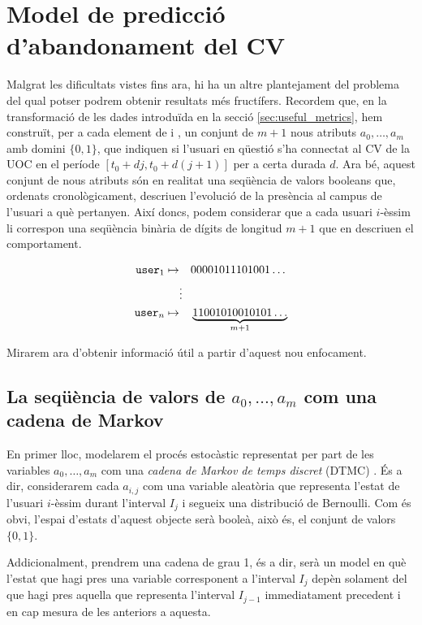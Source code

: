 \documentclass[
	a4paper,
	twoside,
	justified
]{tufte-book}
\begin{document}
\chapter{Model de predicció d'abandonament del CV}

Malgrat les dificultats vistes fins ara, hi ha un altre plantejament del problema del qual potser podrem obtenir resultats més fructífers. Recordem que, en la transformació de les dades introduïda en la secció \ref{sec:useful_metrics}, hem construït, per a cada element de  i , un conjunt de $m+1$ nous atributs $a_0,\ldots,a_m$ amb domini $\{0,1\}$, que indiquen si l'usuari en qüestió s'ha connectat al CV de la UOC en el període $[t_0 + dj, t_0 + d(j+1)]$ per a certa durada $d$. Ara bé, aquest conjunt de nous atributs són en realitat una seqüència de valors booleans que, ordenats cronològicament, descriuen l'evolució de la presència al campus de l'usuari a què pertanyen. Així doncs, podem considerar que a cada usuari $i$-èssim li correspon una seqüència binària de dígits de longitud $m+1$ que en descriuen el comportament.

\begin{align*}
	\texttt{user}_1 \mapsto & \quad 00001011101001\ldots \\
	 & \vdots \\
	\texttt{user}_n \mapsto & \quad \underbrace{11001010010101\ldots}_{m+1} 
\end{align*}       

Mirarem ara d'obtenir informació útil a partir d'aquest nou enfocament.

\section{La seqüència de valors de $a_0, \ldots, a_m$ com una cadena de Markov}

En primer lloc, modelarem el procés estocàstic representat per part de les variables $a_0,\ldots, a_m$ com una \emph{cadena de Markov de temps discret} (DTMC) \citep[p. 1-47]{norris98}. És a dir, considerarem cada $a_{i,j}$ com una variable aleatòria que representa l'estat de l'usuari $i$-èssim durant l'interval $I_j$ i segueix una distribució de Bernoulli. Com és obvi, l'espai d'estats d'aquest objecte serà booleà, això és, el conjunt de valors $\{0,1\}$. 

Addicionalment, prendrem una cadena de grau 1, és a dir, serà un model en què l'estat que hagi pres una variable corresponent a l'interval $I_j$ depèn solament del que hagi pres aquella que representa l'interval $I_{j-1}$ immediatament precedent i en cap mesura de les anteriors a aquesta. 
\end{document}
